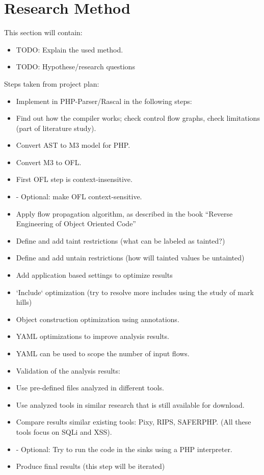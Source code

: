 \documentclass[../main.tex]{subfiles}
\begin{document}
    \section{Research Method}\label{sec:research_method}
    This section will contain:
    \begin{itemize}
        \item TODO: Explain the used method. %
        \item TODO: Hypothese/research questions %
    \end{itemize}
    
    Steps taken from project plan:
    \begin{itemize}
        \item Implement in PHP-Parser/Rascal in the following steps:
        \item Find out how the compiler works; check control flow graphs, check limitations (part of literature study).
        \item Convert AST to M3 model for PHP.
        \item Convert M3 to OFL.
        \item First OFL step is context-insensitive.
        \item - Optional: make OFL context-sensitive.
        \item Apply flow propagation algorithm, as described in the book “Reverse Engineering of Object Oriented Code”
        \item Define and add taint restrictions (what can be labeled as tainted?)
        \item Define and add untain restrictions (how will tainted values be untainted)
        \item Add application based settings to optimize results
        \item `Include` optimization (try to resolve more includes using the study of mark hills)
        \item Object construction optimization using annotations.
        \item YAML optimizations to improve analysis results.
        \item YAML can be used to scope the number of input flows.
        \item Validation of the analysis results:
        \item Use pre-defined files analyzed in different tools.
        \item Use analyzed tools in similar research that is still available for download.
        \item Compare results similar existing tools: Pixy, RIPS, SAFERPHP. (All these tools focus on SQLi and XSS).
        \item - Optional: Try to run the code in the sinks using a PHP interpreter.
        \item Produce final results (this step will be iterated)
    \end{itemize}
\end{document}
